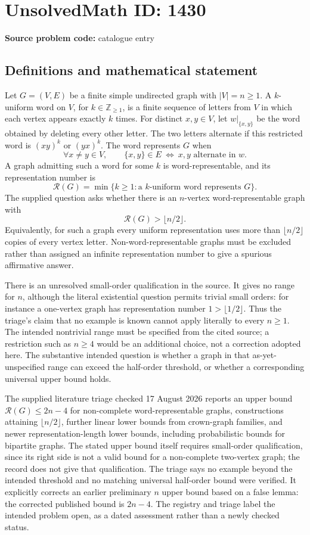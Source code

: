 \documentclass[11pt]{article}
\newcommand{\Z}{\mathbb{Z}}
\begin{document}
\section*{UnsolvedMath ID: 1430}
\textbf{Source problem code:} catalogue entry
\subsection{Definitions and mathematical statement}
Let $G=(V,E)$ be a finite simple undirected graph with $|V|=n\ge1$. A $k$-uniform word on $V$, for $k\in\Z_{\ge1}$, is a finite sequence of letters from $V$ in which each vertex appears exactly $k$ times. For distinct $x,y\in V$, let $w|_{\{x,y\}}$ be the word obtained by deleting every other letter. The two letters alternate if this restricted word is $(xy)^k$ or $(yx)^k$. The word represents $G$ when
\[
 \forall x\ne y\in V,\qquad
 \{x,y\}\in E\ \Longleftrightarrow\ x,y\text{ alternate in }w.
\]
A graph admitting such a word for some $k$ is word-representable, and its representation number is
\[
 \mathcal R(G)=\min\{k\ge1:\text{a $k$-uniform word represents }G\}.
\]
The supplied question asks whether there is an $n$-vertex word-representable graph with
\[
 \mathcal R(G)>\lfloor n/2\rfloor.
\]
Equivalently, for such a graph every uniform representation uses more than $\lfloor n/2\rfloor$ copies of every vertex letter. Non-word-representable graphs must be excluded rather than assigned an infinite representation number to give a spurious affirmative answer.

There is an unresolved small-order qualification in the source. It gives no range for $n$, although the literal existential question permits trivial small orders: for instance a one-vertex graph has representation number $1>\lfloor1/2\rfloor$. Thus the triage's claim that no example is known cannot apply literally to every $n\ge1$. The intended nontrivial range must be specified from the cited source; a restriction such as $n\ge4$ would be an additional choice, not a correction adopted here. The substantive intended question is whether a graph in that as-yet-unspecified range can exceed the half-order threshold, or whether a corresponding universal upper bound holds.

The supplied literature triage checked 17 August 2026 reports an upper bound $\mathcal R(G)\le2n-4$ for non-complete word-representable graphs, constructions attaining $\lfloor n/2\rfloor$, further linear lower bounds from crown-graph families, and newer representation-length lower bounds, including probabilistic bounds for bipartite graphs. The stated upper bound itself requires small-order qualification, since its right side is not a valid bound for a non-complete two-vertex graph; the record does not give that qualification. The triage says no example beyond the intended threshold and no matching universal half-order bound were verified. It explicitly corrects an earlier preliminary $n$ upper bound based on a false lemma: the corrected published bound is $2n-4$. The registry and triage label the intended problem open, as a dated assessment rather than a newly checked status.
\end{document}
